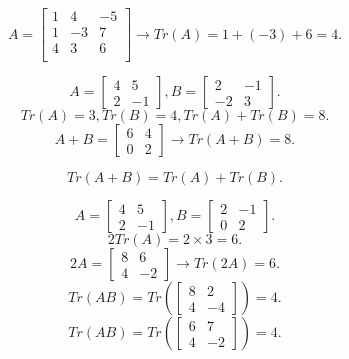 \documentclass{article}
\begin{document}
\[
    A =
    \begin{bmatrix}
        1&4&-5\\
        1&-3&7\\
        4&3&6\\
    \end{bmatrix}
    \longrightarrow
    Tr(A)=1+(-3)+6=4
.\] 

\begin{example}
    \[
        A=
        \begin{bmatrix} 4&5\\2&-1 \end{bmatrix} 
        ,
        B=
        \begin{bmatrix} 2&-1\\-2&3 \end{bmatrix} 
    .\] 
    \[
        Tr(A)=3, Tr(B)=4, Tr(A)+Tr(B)=8
    .\] 
    \[
        A+B=\begin{bmatrix} 6&4\\0&2 \end{bmatrix}
        \longrightarrow
        Tr(A+B)=8
    .\] 
\end{example}

\begin{note}
    \[
        Tr(A+B)=Tr(A)+Tr(B)
    .\] 
\end{note}

\begin{example}[Find $2Tr(A)$, $Tr(2A)$, $Tr(AB)$, $Tr(BA)$]
    \[
        A=
        \begin{bmatrix} 4&5\\2&-1 \end{bmatrix} 
        ,
        B=
        \begin{bmatrix} 2&-1\\0&2 \end{bmatrix} 
    .\] 
    \[
        2Tr(A)=2\times 3=6
    .\] 
    \[
        2A=\begin{bmatrix} 8&6\\4&-2 \end{bmatrix}
        \longrightarrow
        Tr(2A)=6
    .\] 
    \[
        Tr(AB)=Tr(\begin{bmatrix} 8&2\\4&-4 \end{bmatrix} ) =4
    .\] 
    \[
        Tr(AB)=Tr(\begin{bmatrix} 6&7\\4&-2 \end{bmatrix} ) =4
    .\] 
\end{example}
\end{document}
